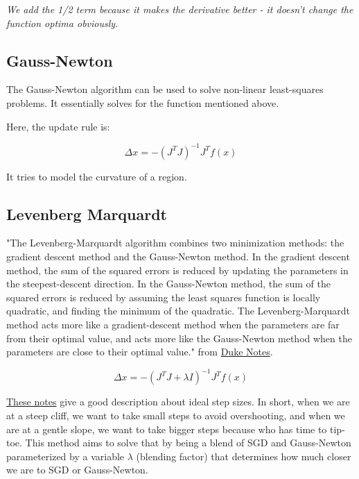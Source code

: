 \textit{We add the 1/2 term because it makes the derivative better - it doesn't change the function optima obviously.}

\subsection{Gauss-Newton}

The Gauss-Newton algorithm can be used to solve non-linear least-squares problems. It essentially solves for the function mentioned above.

Here, the update rule is:

\begin{equation}
    \Delta x = -(J^TJ)^{-1}J^Tf(x)
\end{equation}

It tries to model the curvature of a region.

\subsection{Levenberg Marquardt}

"The Levenberg-Marquardt algorithm combines two  minimization methods: the  gradient descent method and the Gauss-Newton method.  In the gradient descent method, the sum of the squared errors is reduced by updating the parameters in the steepest-descent direction.  In the Gauss-Newton method, the sum of the squared errors is reduced by assuming the least squares function is locally quadratic, and finding the minimum of the  quadratic.   The  Levenberg-Marquardt  method  acts  more  like  a  gradient-descent method  when  the  parameters  are  far  from  their  optimal  value,  and  acts  more  like the Gauss-Newton method when the parameters are close to their optimal value." from \href{http://people.duke.edu/~hpgavin/ce281/lm.pdf}{Duke Notes}.

\begin{equation}
    \Delta x = -(J^TJ + \lambda I)^{-1}J^Tf(x)
\end{equation}

\href{https://cs.nyu.edu/~roweis/notes/lm.pdf}{These notes} give a good description about ideal step sizes. In short, when we are at a steep cliff, we want to take small steps to avoid overshooting, and when we are at a gentle slope, we want to take bigger steps because who has time to tip-toe. This method aims to solve that by being a blend of SGD and Gauss-Newton parameterized by a variable $\lambda$ (blending factor) that determines how much closer we are to SGD or Gauss-Newton. 

